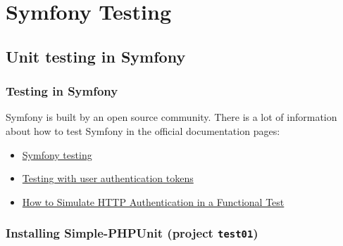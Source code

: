 \documentclass[a4paperpaper,openright]{book}
\newenvironment{Shaded}{}{}
\newcommand{\CommentTok}[1]{\textcolor[rgb]{0.38,0.63,0.69}{\textit{#1}}}
\newcommand{\DecValTok}[1]{\textcolor[rgb]{0.25,0.63,0.44}{#1}}
\newcommand{\FunctionTok}[1]{\textcolor[rgb]{0.02,0.16,0.49}{#1}}
\newcommand{\KeywordTok}[1]{\textcolor[rgb]{0.00,0.44,0.13}{\textbf{#1}}}
\newcommand{\NormalTok}[1]{#1}
\newcommand{\OtherTok}[1]{\textcolor[rgb]{0.00,0.44,0.13}{#1}}
\newcommand{\StringTok}[1]{\textcolor[rgb]{0.25,0.44,0.63}{#1}}
\begin{document}
\begin{Shaded}
\end{Shaded}

\part{Symfony Testing}

\hypertarget{unit-testing-in-symfony}{%
\chapter{Unit testing in Symfony}\label{unit-testing-in-symfony}}

\hypertarget{testing-in-symfony}{%
\section{Testing in Symfony}\label{testing-in-symfony}}

Symfony is built by an open source community. There is a lot of
information about how to test Symfony in the official documentation
pages:

\begin{itemize}
\item
  \href{http://symfony.com/doc/current/testing.html}{Symfony testing}
\item
  \href{http://symfony.com/doc/current/testing/simulating_authentication.html}{Testing
  with user authentication tokens}
\item
  \href{http://symfony.com/doc/current/testing/http_authentication.html}{How
  to Simulate HTTP Authentication in a Functional Test}
\end{itemize}

\hypertarget{installing-simple-phpunit-project-test01}{%
\section{\texorpdfstring{Installing Simple-PHPUnit (project
\texttt{test01})}{Installing Simple-PHPUnit (project test01)}}\label{installing-simple-phpunit-project-test01}}
\end{document}
